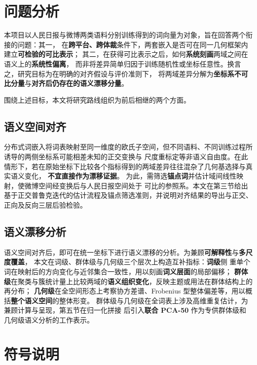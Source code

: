 \documentclass[withoutpreface]{cumcmthesis}
\begin{document}
\tableofcontents
\newpage

\section{问题分析}

本项目以人民日报与微博两类语料分别训练得到的词向量为对象，旨在回答两个衔接的问题：其一，
在\textbf{跨平台、跨体裁}条件下，两套嵌入是否可在同一几何框架内建立\textbf{可检验的可比表示}；
其二，在获得可比表示之后，如何\textbf{系统刻画}两域之间在语义上的\textbf{系统性偏离}，
而非将差异简单归因于训练随机性或坐标任意性。换言之，研究目标为在明确的对齐假设与评价准则下，
将两域差异分解为\textbf{坐标系不可比分量}与\textbf{对齐后仍存在的语义漂移分量}。

围绕上述目标，本文将研究路线组织为前后相继的两个方面。

\subsection{语义空间对齐}
分布式词嵌入将词表映射至同一维度的欧氏子空间，但不同语料、不同训练过程所诱导的两侧坐标系可能相差未知的正交变换与
尺度重标定等非语义自由度。在此情形下，若在原始坐标下比较各个指标得到的两域差异往往混杂了几何基选择与真实语义变化，
\textbf{不宜直接作为漂移证据}。
为此，需筛选\textbf{锚点词}并估计域间线性映射，使微博空间经变换后与人民日报空间处于
可比的参照系。本文在第三节给出基于正交普鲁克迭代的估计流程及锚点筛选准则，并说明对齐结果的导出与正交、正向及反向三层后验检验。

\subsection{语义漂移分析}
语义空间对齐后，即可在统一坐标下进行语义漂移的分析。为兼顾\textbf{可解释性}与\textbf{多尺度覆盖}，
本文在词级、群体级与几何级三个层次上构造互补指标：\textbf{词级}侧
重单个词在映射后的方向变化与近邻集合一致性，用以刻画\textbf{词义层面}的局部偏移；
\textbf{群体级}在聚类与簇统计量上比较两域的\textbf{语义组织变化}，反映主题或用法在群体结构上的再分布；
\textbf{几何级}在全空间形态上考察协方差谱、Frobenius 型整体偏差等，用以概括\textbf{整个语义空间}的整体形变。
群体级与几何级在全词表上涉及高维重复估计，为兼顾计算与呈现，第五节在归一化拼接
后引入\textbf{联合 PCA-50} 作为专供群体级和几何级语义分析的工作表示。

\section{符号说明}
\end{document}
